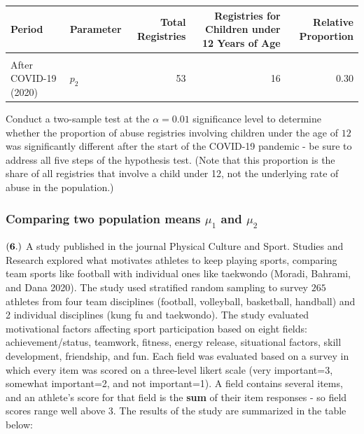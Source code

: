 \documentclass[
]{article}
\begin{document}
\begin{table}[H]
\centering\centering
\begin{tabular}{llrrr}
\toprule
Period & Parameter & Total Registries & Registries for Children under 12 Years of Age & Relative Proportion\\
\midrule
\cellcolor{gray!10}{Before COVID-19 (2019)} & \cellcolor{gray!10}{$p_1$} & \cellcolor{gray!10}{70} & \cellcolor{gray!10}{18} & \cellcolor{gray!10}{0.26}\\
After COVID-19 (2020) & $p_2$ & 53 & 16 & 0.30\\
\bottomrule
\end{tabular}
\end{table}

Conduct a two-sample test at the \(\alpha = 0.01\) significance level to
determine whether the proportion of abuse registries involving children
under the age of \(12\) was significantly different after the start of
the COVID-19 pandemic - be sure to address all five steps of the
hypothesis test. (Note that this proportion is the share of all
registries that involve a child under 12, not the underlying rate of
abuse in the population.)

\subsubsection{\texorpdfstring{Comparing two population means \(\mu_1\)
and
\(\mu_2\)}{Comparing two population means \textbackslash mu\_1 and \textbackslash mu\_2}}\label{comparing-two-population-means-mu_1-and-mu_2}

\(\bf (6.)\) A study published in the journal Physical Culture and
Sport. Studies and Research explored what motivates athletes to keep
playing sports, comparing team sports like football with individual ones
like taekwondo (Moradi, Bahrami, and Dana 2020). The study used
stratified random sampling to survey \(265\) athletes from four team
disciplines (football, volleyball, basketball, handball) and 2
individual disciplines (kung fu and taekwondo). The study evaluated
motivational factors affecting sport participation based on eight
fields: achievement/status, teamwork, fitness, energy release,
situational factors, skill development, friendship, and fun. Each field
was evaluated based on a survey in which every item was scored on a
three-level likert scale (very important=3, somewhat important=2, and
not important=1). A field contains several items, and an athlete's score
for that field is the \textbf{sum} of their item responses - so field
scores range well above 3. The results of the study are summarized in
the table below:
\end{document}
